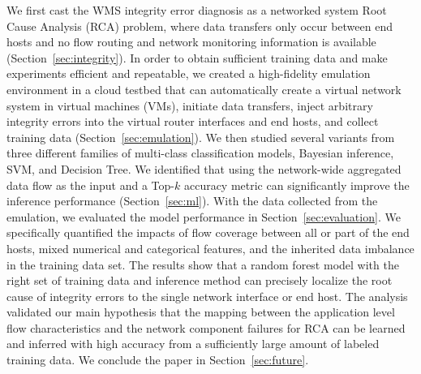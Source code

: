 We first cast the WMS integrity error diagnosis as a networked system Root Cause Analysis (RCA) problem, where data transfers only occur between end hosts and no flow routing and network monitoring information is available (Section~\ref{sec:integrity}).  In order to obtain sufficient training data and make experiments efficient and repeatable, we created a high-fidelity emulation environment in a cloud testbed that can automatically create a virtual network system in virtual machines (VMs), initiate data transfers, inject arbitrary integrity errors into the virtual router interfaces and end hosts, and collect training data (Section~\ref{sec:emulation}). We then studied several variants from three different families of multi-class classification models, Bayesian inference, SVM, and Decision Tree. We identified that using the network-wide aggregated data flow as the input and a Top-$k$ accuracy metric can significantly improve the inference performance (Section~\ref{sec:ml}). With the data collected from the emulation, we evaluated the model performance in Section~\ref{sec:evaluation}. We specifically quantified the impacts of flow coverage between all or part of the end hosts, mixed numerical and categorical features, and the inherited data imbalance in the training data set. The results show that a random forest model with the right set of training data and inference method can precisely localize the root cause of integrity errors to the single network interface or end host. The analysis validated our main hypothesis that the mapping between the application level flow characteristics and the network component failures for RCA can be learned and inferred with high accuracy from a sufficiently large amount of labeled training data. We conclude the paper in Section~\ref{sec:future}.
